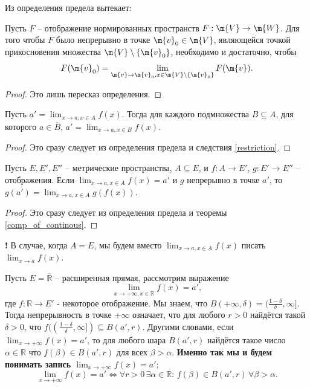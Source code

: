 Из определения предела вытекает:
\begin{theorem}\label{criteria_of_continous_on_Rn}
Пусть $F$  -- отображение нормированных пространств $F: \m{V} \to \m{W}$. Для того чтобы $F$ было непрерывно в точке $\m{v}_0 \in \m{V}$, являющейся точкой прикосновения множества $\m{V}\setminus\{\m{v}_0\}$, необходимо и достаточно, чтобы $$F(\m{v}_0) = \lim_{\m{v} \to \m{v}_0, x\in \m{V} \setminus \{\m{v}_0\}}F(\m{v}).$$
\end{theorem}
\begin{proof}
    Это лишь пересказ определения.
\end{proof}

\begin{theorem}\label{limit_for_any_subset}
    Пусть $a' = \lim_{x \to a, x \in A} f(x)$. Тогда для каждого подмножества $B \subseteq A$, для которого $a \in \overline{B}$, $a' = \lim_{x \to a, x \in B}f(x)$.
\end{theorem}

\begin{proof}
    Это сразу следует из определения предела и следствия \ref{restriction}.
\end{proof}

\begin{theorem}\label{lim_of_composition}
    Пусть $E,E',E''$ -- метрические пространства, $A \subseteq E$, и $f:A \to E'$, $g:E' \to E''$ -- отображения. Если $\lim_{x \to a, x \in A}f(x) = a'$ и $g$ непрерывно в точке $a'$, то $g(a') = \lim_{x \to a, x \in A}g(f(x))$. 
\end{theorem}
\begin{proof}
    Это сразу следует из определения предела и теоремы \ref{comp_of_continous}.
\end{proof}

\begin{mydanger}{\bf{!}}
    В случае, когда $A = E$, мы будем вместо $\lim_{x \to a, x \in A}f(x)$  писать $\lim_{x \to a}f(x).$
\end{mydanger}

\begin{remark}
 Пусть $E = \overline{\mathbb{R}}$ -- расширенная прямая, рассмотрим выражение $$\lim_{x \to +\infty, x \in \mathbb{{R}}}f(x) = a',$$ где $f:\mathbb{R} \to E' $ - некоторое отображение. Мы знаем, что $B(+\infty, \delta) = (\frac{1-\delta}{\delta}, \infty]$. Тогда непрерывность в точке $+\infty$ означает, что для любого $r >0$ найдётся такой $\delta>0$, что $f((\frac{1-\delta}{\delta}, \infty]) \subseteq B(a',r)$. Другими словами, если $\lim_{x \to + \infty} f(x) = a'$, то для любого шара $B(a',r)$ найдётся такое число $\alpha \in \mathbb{R}$ что $f(\beta) \in B(a',r)$ для всех $\beta > \alpha.$ \textbf{Именно так мы и будем понимать запись $\lim_{x \to +\infty}f(x) = a'$};
 \[
  \boxed{ 
    \boxed{
    \lim_{x \to +\infty}f(x) = a' \Longleftrightarrow \forall r > 0\, \exists \alpha \in \mathbb{R}:\, f(\beta) \in B(a',r) \,\forall \beta >\alpha.
    }
}
 \]
\end{remark}

